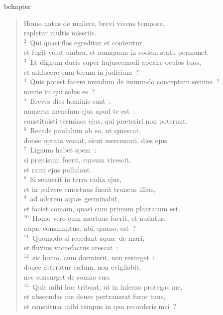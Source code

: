 bchapter\begin{flushleft}\begin{verse}\vspace{-19pt}\hspace{6pt}Homo natus de muliere, brevi vivens tempore,\\\hspace{6pt} repletur multis miseriis.\\
${}^{2}$~Qui quasi flos egreditur et conteritur,\\ et fugit velut umbra, et numquam in eodem statu permanet.\\
${}^{3}$~Et dignum ducis super hujuscemodi aperire oculos tuos,\\ et adducere eum tecum in judicium~?\\
${}^{4}$~Quis potest facere mundum de immundo conceptum semine~?\\ nonne tu qui solus es~?\\
${}^{5}$~Breves dies hominis sunt~:\\ numerus mensium ejus apud te est~:\\ constituisti terminos ejus, qui pr\ae teriri non poterunt.\\
${}^{6}$~Recede paululum ab eo, ut quiescat,\\ donec optata veniat, sicut mercenarii, dies ejus.\\
${}^{7}$~Lignum habet spem~:\\ si pr\ae cisum fuerit, rursum virescit,\\ et rami ejus pullulant.\\
${}^{8}$~Si senuerit in terra radix ejus,\\ et in pulvere emortuus fuerit truncus illius,\\
${}^{9}$~ad odorem aqu\ae\ germinabit,\\ et faciet comam, quasi cum primum plantatum est.\\
${}^{10}$~Homo vero cum mortuus fuerit, et nudatus,\\ atque consumptus, ubi, qu\ae so, est~?\\
${}^{11}$~Quomodo si recedant aqu\ae\ de mari,\\ et fluvius vacuefactus arescat~:\\
${}^{12}$~sic homo, cum dormierit, non resurget~:\\ donec atteratur c\ae lum, non evigilabit,\\ nec consurget de somno suo.\\
${}^{13}$~Quis mihi hoc tribuat, ut in inferno protegas me,\\ et abscondas me donec pertranseat furor tuus,\\ et constituas mihi tempus in quo recorderis mei~?\\

\end{verse}
\end{flushleft}
